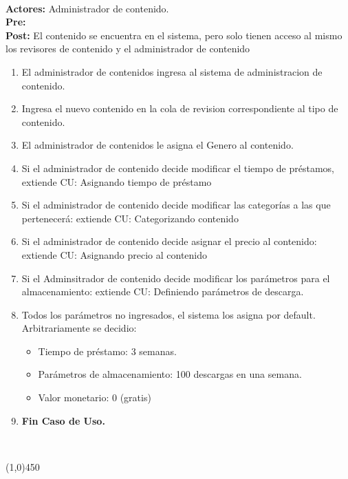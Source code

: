 \documentclass[11pt, a4paper, spanish]{article}
\begin{document}
{	 \\
\textbf{Actores:} Administrador de contenido. \\
\textbf{Pre:}  \\
\textbf{Post:} El contenido se encuentra en el sistema, pero solo tienen acceso al mismo los revisores de contenido y el administrador de contenido\\
\begin{enumerate}
	\item El administrador de contenidos ingresa al sistema de administracion de contenido.
\item Ingresa el nuevo contenido en la cola de revision correspondiente al tipo de contenido.
\item El administrador de contenidos le asigna el Genero al contenido.
\item Si el administrador de contenido decide modificar el tiempo de préstamos, extiende CU: Asignando tiempo de préstamo
\item Si el administrador de contenido decide modificar las categorías a las que pertenecerá: extiende CU: Categorizando contenido
\item Si el administrador de contenido decide asignar el precio al contenido: extiende CU: Asignando precio al contenido
\item Si el Adminsitrador de contenido decide modificar los parámetros para el almacenamiento: extiende CU: Definiendo parámetros de descarga.
\item Todos los parámetros no ingresados, el sistema los asigna por default. Arbitrariamente se decidio: 
\begin{itemize}
\item Tiempo de préstamo: 3 semanas.  
\item Parámetros de almacenamiento: 100 descargas en una semana.
\item Valor monetario: 0 (gratis)
\end{itemize}
\item \textbf{Fin Caso de Uso.} \\

\end{enumerate}
 \\
\begin{center} \line(1,0){450} \end{center}


}
\end{document}

